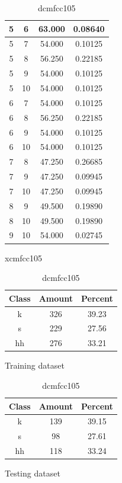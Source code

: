 \begin{table}
\begin{subtable}[tbp]{0.45\textwidth}
{\begin{tabular}{|c|c|c|c|}
 5 & 6 & 63.000 & 0.08640\\ \hline 
 5 & 7 & 54.000 & 0.10125\\ \hline 
 5 & 8 & 56.250 & 0.22185\\ \hline 
 5 & 9 & 54.000 & 0.10125\\ \hline 
 5 & 10 & 54.000 & 0.10125\\ \hline 
 6 & 7 & 54.000 & 0.10125\\ \hline 
 6 & 8 & 56.250 & 0.22185\\ \hline 
 6 & 9 & 54.000 & 0.10125\\ \hline 
 6 & 10 & 54.000 & 0.10125\\ \hline 
 7 & 8 & 47.250 & 0.26685\\ \hline 
 7 & 9 & 47.250 & 0.09945\\ \hline 
 7 & 10 & 47.250 & 0.09945\\ \hline 
 8 & 9 & 49.500 & 0.19890\\ \hline 
 8 & 10 & 49.500 & 0.19890\\ \hline 
 9 & 10 & 54.000 & 0.02745\\ \hline 

\end{tabular}
} \label{xlmfcc105}
\caption{xcmfcc105}
\end{subtable}

\begin{subtable}[tbp]{0.45\textwidth}
\centering
\begin{tabular}{|c|c|c|}
\hline
Class & Amount & Percent\\ \hline
k & 326 & 39.23\\ \hline
s & 229 & 27.56\\ \hline
hh & 276 & 33.21\\ \hline
\end{tabular}
\caption{Training dataset}
\end{subtable}
\hfill
\begin{subtable}[tbp]{0.45\textwidth}
\centering
\begin{tabular}{|c|c|c|}
\hline
Class & Amount & Percent\\ \hline
k & 139 & 39.15\\ \hline
s & 98 & 27.61\\ \hline
hh & 118 & 33.24\\ \hline
\end{tabular}
\caption{Testing dataset}
\end{subtable}
\hfill

\label{dlmfcc105}

\caption{dcmfcc105}

\end{table}\clearpage


